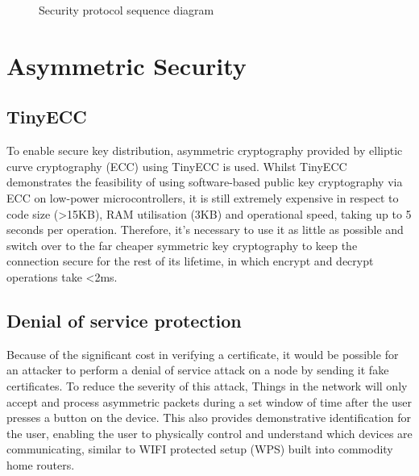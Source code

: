 \documentclass{mpaper}
\begin{document}
\begin{figure}[h!]
\begin{center}

\caption{Security protocol sequence diagram}
\label{fig:sequence_diagram}
\end{center}
\end{figure}


\section{Asymmetric Security} %
\label{sec:asymmetric_security}
\subsection{TinyECC} %
\label{sub:tinyecc}
To enable secure key distribution, asymmetric cryptography provided by elliptic curve cryptography (ECC) using TinyECC\cite{TinyECC} is used. Whilst TinyECC demonstrates the feasibility of using software-based public key cryptography via ECC on low-power microcontrollers, it is still extremely expensive in respect to code size (\textgreater15KB), RAM utilisation (3KB) and operational speed, taking up to 5 seconds per operation. Therefore, it's necessary to use it as little as possible and switch over to the far cheaper symmetric key cryptography to keep the connection secure for the rest of its lifetime, in which encrypt and decrypt operations take \textless 2ms.

\subsection{Denial of service protection} %
\label{sub:denial_of_service_protection}
Because of the significant cost in verifying a certificate, it would be possible for an attacker to perform a denial of service attack on a node by sending it fake certificates. To reduce the severity of this attack, Things in the network will only accept and process asymmetric packets during a set window of time after the user presses a button on the device. This also provides demonstrative identification for the user, enabling the user to physically control and understand which devices are communicating, similar to WIFI protected setup (WPS) built into commodity home routers.
\end{document}
